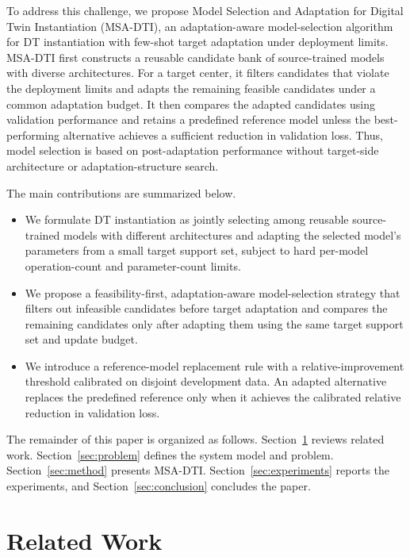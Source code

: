 \documentclass[a4paper,fleqn]{cas-sc}
\begin{document}
To address this challenge, we propose Model Selection and Adaptation for
Digital Twin Instantiation (MSA-DTI), an adaptation-aware model-selection
algorithm for DT instantiation with few-shot target adaptation under deployment
limits. MSA-DTI first
constructs a reusable candidate bank of source-trained models with diverse
architectures. For a target center, it filters candidates that violate the
deployment limits and adapts the remaining feasible candidates under a common adaptation
budget. It then compares the adapted candidates using validation performance
and retains a predefined reference model unless the best-performing alternative
achieves a sufficient reduction in validation loss. Thus, model selection is
based on post-adaptation performance without target-side architecture or
adaptation-structure search.

The main contributions are summarized below.

\begin{itemize}

\item We formulate DT instantiation as jointly selecting among reusable
source-trained models with different architectures and adapting the selected
model's parameters from a small target support set, subject to hard per-model
operation-count and parameter-count limits.

\item We propose a feasibility-first, adaptation-aware model-selection strategy
that filters out infeasible candidates before target adaptation and compares
the remaining candidates only after adapting them using the same target support
set and update budget.

\item We introduce a reference-model replacement rule with a relative-improvement
threshold calibrated on disjoint development data. An adapted alternative
replaces the predefined reference only when it achieves the calibrated relative
reduction in validation loss.

\end{itemize}

The remainder of this paper is organized as follows.
Section~\ref{sec:related} reviews related work.
Section~\ref{sec:problem} defines the system model and problem.
Section~\ref{sec:method} presents MSA-DTI.
Section~\ref{sec:experiments} reports the experiments, and
Section~\ref{sec:conclusion} concludes the paper.

\section{Related Work}
\label{sec:related}
\end{document}

